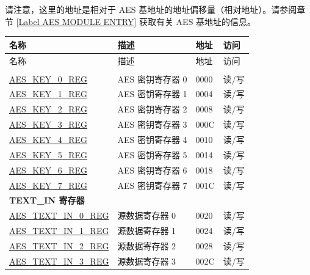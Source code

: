请注意，这里的地址是相对于 AES 基地址的地址偏移量（相对地址）。请参阅章节 \ref{Label AES MODULE ENTRY} 获取有关 AES 基地址的信息。

\begin{longtable}{ | p{5.2cm} | p{6.6cm} | p{2cm} | p{1.2cm} | }
\hline\rowcolor{lightgray}
名称 & 描述 &  地址 & 访问 \\ \hline
\endfirsthead
        \hline
        \rowcolor{lightgray}
       名称 & 描述 & 地址 & 访问  \\
        \hline
        \endhead
        \endfoot

\multicolumn{4}{|l|}{\textbf{密钥寄存器}} \\ \hline

\hyperref[regdesc:AESKEYnREG]{AES\_KEY\_0\_REG}				&	AES 密钥寄存器 0				& \hexprefix{}0000 & 读/写 \\ \hline
\hyperref[regdesc:AESKEYnREG]{AES\_KEY\_1\_REG}				&	AES 密钥寄存器 1				& \hexprefix{}0004 & 读/写 \\ \hline
\hyperref[regdesc:AESKEYnREG]{AES\_KEY\_2\_REG}				&	AES 密钥寄存器 2				& \hexprefix{}0008 & 读/写 \\ \hline
\hyperref[regdesc:AESKEYnREG]{AES\_KEY\_3\_REG}				&	AES 密钥寄存器 3				& \hexprefix{}000C & 读/写 \\ \hline
\hyperref[regdesc:AESKEYnREG]{AES\_KEY\_4\_REG}				&	AES 密钥寄存器 4				& \hexprefix{}0010 & 读/写 \\ \hline
\hyperref[regdesc:AESKEYnREG]{AES\_KEY\_5\_REG}				&	AES 密钥寄存器 5				& \hexprefix{}0014 & 读/写 \\ \hline
\hyperref[regdesc:AESKEYnREG]{AES\_KEY\_6\_REG}				&	AES 密钥寄存器 6				& \hexprefix{}0018 & 读/写 \\ \hline
\hyperref[regdesc:AESKEYnREG]{AES\_KEY\_7\_REG}				&	AES 密钥寄存器 7				& \hexprefix{}001C & 读/写 \\ \hline

\multicolumn{4}{|l|}{\textbf{TEXT\_IN 寄存器}} \\ \hline

\hyperref[regdesc:AESTEXTINnREG]{AES\_TEXT\_IN\_0\_REG}			&	源数据寄存器 0					& \hexprefix{}0020 & 读/写 \\ \hline
\hyperref[regdesc:AESTEXTINnREG]{AES\_TEXT\_IN\_1\_REG}			&	源数据寄存器 1					& \hexprefix{}0024 & 读/写 \\ \hline
\hyperref[regdesc:AESTEXTINnREG]{AES\_TEXT\_IN\_2\_REG}			&	源数据寄存器 2					& \hexprefix{}0028 & 读/写 \\ \hline
\hyperref[regdesc:AESTEXTINnREG]{AES\_TEXT\_IN\_3\_REG}			&	源数据寄存器 3					& \hexprefix{}002C & 读/写 \\ \hline


\end{longtable}
